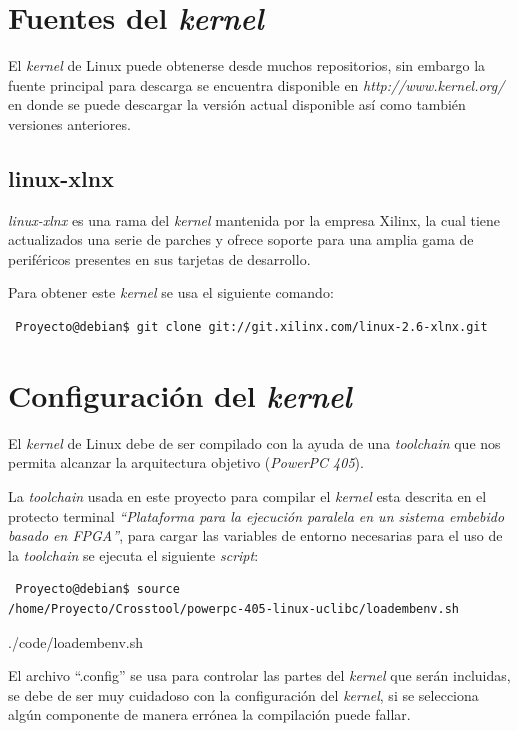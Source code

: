 \section{Fuentes del \emph{kernel}}

El \emph{kernel} de Linux puede obtenerse desde muchos repositorios, sin
embargo la fuente principal para descarga se encuentra disponible en
\emph{http://www.kernel.org/} en donde se puede descargar la versión actual
disponible así como también versiones anteriores.

\subsection{linux-xlnx}

\emph{linux-xlnx} es una rama del \emph{kernel} mantenida por la empresa
Xilinx, la cual tiene actualizados una serie de parches y ofrece soporte para
una amplia gama de periféricos presentes en sus tarjetas de desarrollo.

Para obtener este \emph{kernel} se usa el siguiente comando:

\begin{verbatim}
 Proyecto@debian$ git clone git://git.xilinx.com/linux-2.6-xlnx.git
\end{verbatim}



\section{Configuración del \emph{kernel}}


El \emph{kernel} de Linux debe de ser compilado con la ayuda de una
\emph{toolchain} que nos permita alcanzar la arquitectura objetivo
(\emph{PowerPC 405}).

La \emph{toolchain} usada en este proyecto para compilar el \emph{kernel} esta
descrita en el protecto terminal \emph{``Plataforma para la ejecución paralela
en un sistema embebido basado en FPGA''}\cite{Beto}, para cargar las variables
de entorno necesarias para el uso de la \emph{toolchain} se ejecuta el siguiente
\emph{script}:


\begin{verbatim}
 Proyecto@debian$ source
/home/Proyecto/Crosstool/powerpc-405-linux-uclibc/loadembenv.sh
\end{verbatim}



{./code/loadembenv.sh}


El archivo ``.config'' se usa para controlar las partes del \emph{kernel} que
serán incluidas, se debe de ser muy cuidadoso con la configuración del
\emph{kernel}, si se selecciona algún componente de manera errónea la
compilación puede fallar.

